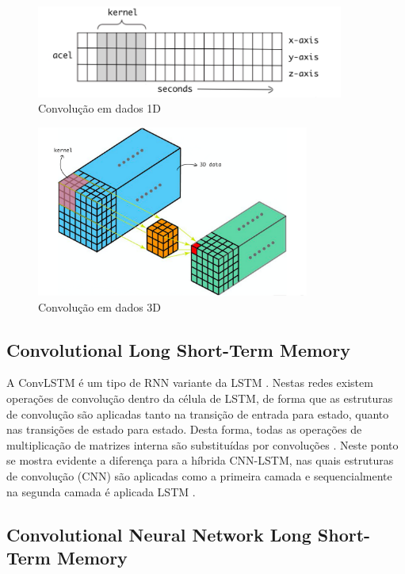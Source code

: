 \begin{figure}[h]
  \centering
  \caption{Convolução em dados 1D}
   \label{fig:cnn_convolution}
   \includegraphics[width=0.9\textwidth]{figuras/fig_11.png}
\end{figure}

\begin{figure}[h]
  \centering
  \caption{Convolução em dados 3D}
   \label{fig:cnn_convolution_3d}
   \includegraphics[width=0.8\textwidth]{figuras/fig_12.png}
\end{figure}

\subsection{Convolutional Long Short-Term Memory}

A ConvLSTM é um tipo de RNN variante da LSTM \cite{Salman2018}. Nestas redes existem operações de convolução dentro da célula de LSTM, de forma que as estruturas de convolução são aplicadas tanto na transição de entrada para estado, quanto nas transições de estado para estado. Desta forma, todas as operações de multiplicação de matrizes interna são substituídas por convoluções \cite{Rahman2019}. Neste ponto se mostra evidente a diferença para a híbrida CNN-LSTM, nas quais estruturas de convolução (CNN) são aplicadas como a primeira camada e sequencialmente na segunda camada é aplicada LSTM \cite{Rahman2019}.

\subsection{Convolutional Neural Network Long Short-Term Memory}


